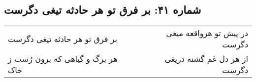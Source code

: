 \begin{center}
\section*{شماره ۴۱: بر فرق تو هر حادثه تیغی دگرست}
\label{sec:041}
\begin{longtable}{l p{0.5cm} r}
بر فرق تو هر حادثه تیغی دگرست
&&
در پیش تو هرواقعه میغی دگرست
\\
هر برگ و گیاهی که برون رُست ز خاک
&&
از هر دل غم گشته دریغی دگرست
\\
\end{longtable}
\end{center}
